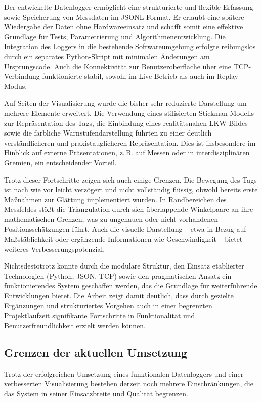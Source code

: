 \documentclass[a4paper, 12pt]{article} %
\begin{document}
Der entwickelte Datenlogger ermöglicht eine strukturierte und flexible Erfassung sowie Speicherung von Messdaten im \ac{JSONL}-Format. Er erlaubt eine 
spätere Wiedergabe der Daten ohne Hardwareeinsatz und schafft somit eine effektive Grundlage für Tests, Parametrierung und Algorithmenentwicklung. 
Die Integration des Loggers in die bestehende Softwareumgebung erfolgte reibungslos durch ein separates Python-Skript mit minimalen Änderungen am 
Ursprungscode. Auch die Konnektivität zur Benutzeroberfläche über eine TCP-Verbindung funktionierte stabil, sowohl im Live-Betrieb als auch im 
Replay-Modus.

Auf Seiten der Visualisierung wurde die bisher sehr reduzierte Darstellung um mehrere Elemente erweitert. Die Verwendung eines stilisierten 
Stickman-Modells zur Repräsentation des Tags, die Einbindung eines realitätsnahen \ac{LKW}-Bildes sowie die farbliche Warnstufendarstellung 
führten zu einer deutlich verständlicheren und praxistauglicheren Repräsentation. Dies ist insbesondere im Hinblick auf externe Präsentationen, 
z.\,B. auf Messen oder in interdisziplinären Gremien, ein entscheidender Vorteil.

Trotz dieser Fortschritte zeigen sich auch einige Grenzen. Die Bewegung des Tags ist nach wie vor leicht verzögert und nicht vollständig flüssig, 
obwohl bereits erste Maßnahmen zur Glättung implementiert wurden. In Randbereichen des Messfeldes stößt die Triangulation durch sich überlappende 
Winkelpaare an ihre mathematischen Grenzen, was zu ungenauen oder nicht vorhandenen Positionsschätzungen führt. Auch die visuelle Darstellung – etwa in 
Bezug auf Maßstäblichkeit oder ergänzende Informationen wie Geschwindigkeit – bietet weiteres Verbesserungspotenzial.

Nichtsdestotrotz konnte durch die modulare Struktur, den Einsatz etablierter Technologien (Python, JSON, TCP) sowie den pragmatischen Ansatz ein 
funktionierendes System geschaffen werden, das die Grundlage für weiterführende Entwicklungen bietet. Die Arbeit zeigt damit deutlich, dass durch 
gezielte Ergänzungen und strukturiertes Vorgehen auch in einer begrenzten Projektlaufzeit signifikante Fortschritte in Funktionalität und 
Benutzerfreundlichkeit erzielt werden können.

\subsection{Grenzen der aktuellen Umsetzung}

Trotz der erfolgreichen Umsetzung eines funktionalen Datenloggers und einer verbesserten Visualisierung bestehen derzeit noch mehrere Einschränkungen, 
die das System in seiner Einsatzbreite und Qualität begrenzen.
\end{document}
